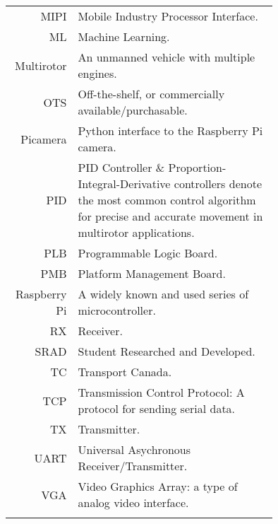 \begin{tabular}[h]{rp{0.75\linewidth}}
    MIPI & Mobile Industry Processor Interface. \\
    ML & Machine Learning.\\
    Multirotor & An unmanned vehicle with multiple engines. \\
    OTS & Off-the-shelf, or commercially available/purchasable. \\
    Picamera & Python interface to the Raspberry Pi camera. \\
    PID & PID Controller \& Proportion-Integral-Derivative controllers denote the most common control algorithm for precise and accurate movement in multirotor applications.\\
    PLB & Programmable Logic Board. \\
    PMB & Platform Management Board. \\
    Raspberry Pi & A widely known and used series of microcontroller. \\
    RX & Receiver.\\
    SRAD & Student Researched and Developed. \\
    TC & Transport Canada.\\
    TCP & Transmission Control Protocol: A protocol for sending serial data. \\
    TX & Transmitter.\\\
    UART & Universal Asychronous Receiver/Transmitter. \\
    VGA & Video Graphics Array: a type of analog video interface. \\
     & \\

    \hline

\end{tabular}
